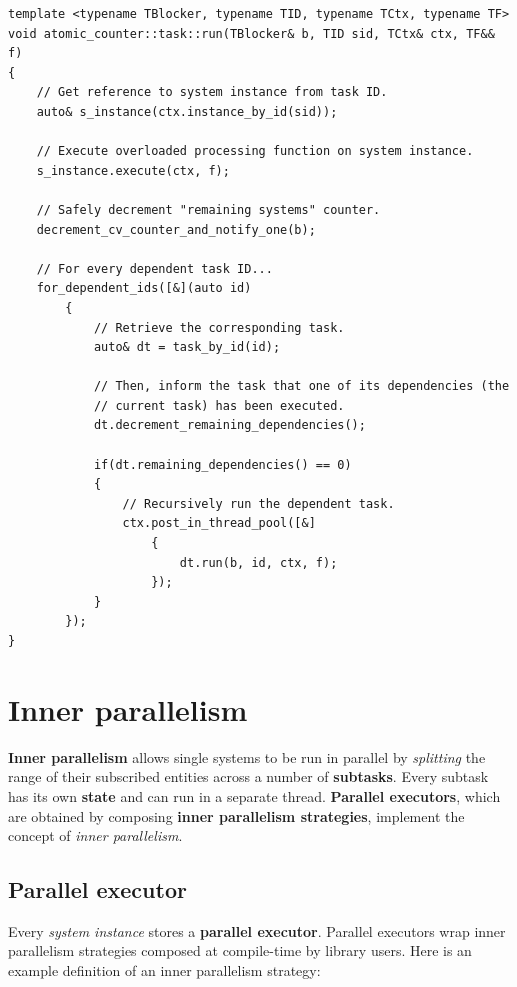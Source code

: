 \documentclass[twoside, 12pt, a4paper, openright]{book}
\begin{document}
\begin{verbatim}
template <typename TBlocker, typename TID, typename TCtx, typename TF>
void atomic_counter::task::run(TBlocker& b, TID sid, TCtx& ctx, TF&& f)
{
    // Get reference to system instance from task ID.
    auto& s_instance(ctx.instance_by_id(sid));

    // Execute overloaded processing function on system instance.
    s_instance.execute(ctx, f);

    // Safely decrement "remaining systems" counter.
    decrement_cv_counter_and_notify_one(b);

    // For every dependent task ID...
    for_dependent_ids([&](auto id)
        {
            // Retrieve the corresponding task.
            auto& dt = task_by_id(id);

            // Then, inform the task that one of its dependencies (the
            // current task) has been executed.
            dt.decrement_remaining_dependencies();

            if(dt.remaining_dependencies() == 0)
            {
                // Recursively run the dependent task.
                ctx.post_in_thread_pool([&]
                    {
                        dt.run(b, id, ctx, f);
                    });
            }
        });
}
\end{verbatim}

\hypertarget{multithreading_inner_par}{\section{Inner
parallelism}\label{multithreading_inner_par}}

\textbf{Inner parallelism} allows single systems to be run in parallel
by \emph{splitting} the range of their subscribed entities across a
number of \textbf{subtasks}. Every subtask has its own \textbf{state}
and can run in a separate thread. \textbf{Parallel executors}, which are
obtained by composing \textbf{inner parallelism strategies}, implement
the concept of \emph{inner parallelism}.

\hypertarget{multithreading_par_executor}{\subsection{Parallel
executor}\label{multithreading_par_executor}}

Every \emph{system instance} stores a \textbf{parallel executor}.
Parallel executors wrap inner parallelism strategies composed at
compile-time by library users. Here is an example definition of an inner
parallelism strategy:
\end{document}
